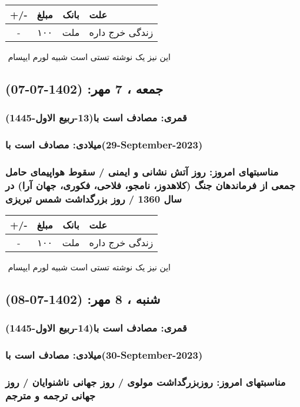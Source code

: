 \documentclass{article}
\newcommand{\rnote}[1]{\marginpar{\textcolor{color}{\StrSubstitute{\##1}{ }{\_}}}}
\newcommand{\myRow}[4]{
    #1 & #2 & #3 & #4 \\ \hline
}
\begin{document}
\begin{tabular}{ | c | c | c | p{5cm} |}
    \hline
    \myRow{ +/- }{مبلغ}{بانک}{علت}
    \myRow{-}{۱۰۰}{ملت}{زندگی خرج داره}
\end{tabular}
\newline
\newline

‌
\rnote{تست}
این نیز یک نوشته تستی است شبیه لورم ایپسام




\newpage
{}
\textcolor{color}{
\section{ جمعه ، 7 مهر: (1402-07-07) }
\subsubsection*{قمری: مصادف است با(13-ربیع الاول-1445)} 
\subsubsection*{میلادی: مصادف است با(29-September-2023)}
\subsubsection*{مناسبتهای امروز: روز آتش نشانی و ایمنی / سقوط هواپیمای حامل جمعی از فرماندهان جنگ (کلاهدوز، نامجو، فلاحی، فکوری، جهان آرا) در سال 1360 / روز بزرگداشت شمس تبریزی}
}


\begin{tabular}{ | c | c | c | p{5cm} |}
    \hline
    \myRow{ +/- }{مبلغ}{بانک}{علت}
    \myRow{-}{۱۰۰}{ملت}{زندگی خرج داره}
\end{tabular}
\newline
\newline

‌
\rnote{تست}
این نیز یک نوشته تستی است شبیه لورم ایپسام




\newpage
{}
\textcolor{color}{
\section{ شنبه ، 8 مهر: (1402-07-08) }
\subsubsection*{قمری: مصادف است با(14-ربیع الاول-1445)} 
\subsubsection*{میلادی: مصادف است با(30-September-2023)}
\subsubsection*{مناسبتهای امروز: روزبزرگداشت مولوی / روز جهانی ناشنوایان / روز جهانی ترجمه و مترجم}
}
\end{document}
